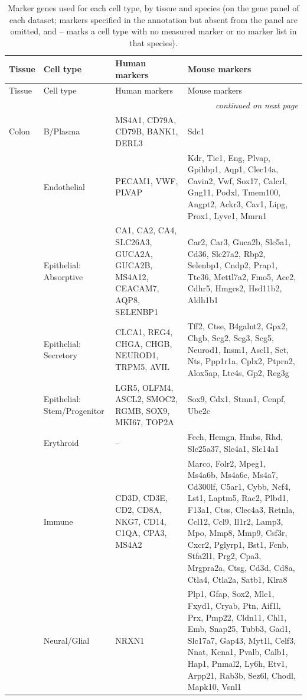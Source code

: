 {\footnotesize
\begin{longtable}{@{} p{} p{} p{} p{} @{}}
\caption{Marker genes used for each cell type, by tissue and species (on the gene panel of each dataset; markers specified in the annotation but absent from the panel are omitted, and -- marks a cell type with no measured marker or no marker list in that species).}
\label{tab:markers} \\
\toprule
Tissue & Cell type & Human markers & Mouse markers \\
\midrule
\endfirsthead
\toprule
Tissue & Cell type & Human markers & Mouse markers \\
\midrule
\endhead
\midrule \multicolumn{4}{r}{\textit{continued on next page}} \\
\endfoot
\bottomrule
\endlastfoot
Colon & B/Plasma & MS4A1, CD79A, CD79B, BANK1, DERL3 & Sdc1 \\
 & Endothelial & PECAM1, VWF, PLVAP & Kdr, Tie1, Eng, Plvap, Gpihbp1, Aqp1, Clec14a, Cavin2, Vwf, Sox17, Calcrl, Gng11, Podxl, Tmem100, Angpt2, Ackr3, Cav1, Lipg, Prox1, Lyve1, Mmrn1 \\
 & Epithelial: Absorptive & CA1, CA2, CA4, SLC26A3, GUCA2A, GUCA2B, MS4A12, CEACAM7, AQP8, SELENBP1 & Car2, Car3, Guca2b, Slc5a1, Cd36, Slc27a2, Rbp2, Selenbp1, Cndp2, Prap1, Ttc36, Mettl7a2, Fmo5, Ace2, Cdhr5, Hmgcs2, Hsd11b2, Aldh1b1 \\
 & Epithelial: Secretory & CLCA1, REG4, CHGA, CHGB, NEUROD1, TRPM5, AVIL & Tff2, Ctse, B4galnt2, Gpx2, Chgb, Scg2, Scg3, Scg5, Neurod1, Insm1, Ascl1, Sct, Nts, Ppp1r1a, Cplx2, Ptprn2, Alox5ap, Ltc4s, Gp2, Reg3g \\
 & Epithelial: Stem/Progenitor & LGR5, OLFM4, ASCL2, SMOC2, RGMB, SOX9, MKI67, TOP2A & Sox9, Cdx1, Stmn1, Cenpf, Ube2c \\
 & Erythroid & -- & Fech, Hemgn, Hmbs, Rhd, Slc25a37, Slc4a1, Slc14a1 \\
 & Immune & CD3D, CD3E, CD2, CD8A, NKG7, CD14, C1QA, CPA3, MS4A2 & Marco, Folr2, Mpeg1, Ms4a6b, Ms4a6c, Ms4a7, Cd300lf, C5ar1, Cybb, Ncf4, Lst1, Laptm5, Rac2, Plbd1, F13a1, Ctss, Clec4a3, Retnla, Ccl12, Ccl9, Il1r2, Lamp3, Mpo, Mmp8, Mmp9, Csf3r, Cxcr2, Pglyrp1, Bst1, Fcnb, Stfa2l1, Prg2, Cpa3, Mrgpra2a, Ctsg, Cd3d, Cd8a, Ctla4, Ctla2a, Satb1, Klra8 \\
 & Neural/Glial & NRXN1 & Plp1, Gfap, Sox2, Mlc1, Fxyd1, Cryab, Ptn, Aif1l, Prx, Pmp22, Cldn11, Chl1, Emb, Snap25, Tubb3, Gad1, Slc17a7, Gap43, Myt1l, Celf3, Nnat, Kcna1, Pvalb, Calb1, Hap1, Pnmal2, Ly6h, Etv1, Arpp21, Rab3b, Sez6l, Chodl, Mapk10, Vsnl1 \\

\end{longtable}}

